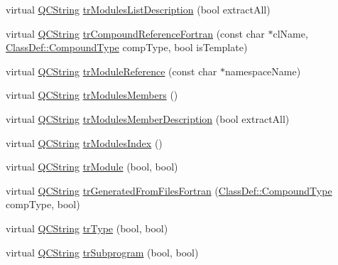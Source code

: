 \begin{DoxyCompactItemize}
\item 
virtual \mbox{\hyperlink{class_q_c_string}{Q\+C\+String}} \mbox{\hyperlink{class_translator_chinesetraditional_ab4c7704858f5c6b7d92b9a367c315b34}{tr\+Modules\+List\+Description}} (bool extract\+All)
\item 
virtual \mbox{\hyperlink{class_q_c_string}{Q\+C\+String}} \mbox{\hyperlink{class_translator_chinesetraditional_a7a1b3c9186c8afb16d7538fbd7f66f0b}{tr\+Compound\+Reference\+Fortran}} (const char $\ast$cl\+Name, \mbox{\hyperlink{class_class_def_ae70cf86d35fe954a94c566fbcfc87939}{Class\+Def\+::\+Compound\+Type}} comp\+Type, bool is\+Template)
\item 
virtual \mbox{\hyperlink{class_q_c_string}{Q\+C\+String}} \mbox{\hyperlink{class_translator_chinesetraditional_a63c0050b0ba4948ed0edb913712b1176}{tr\+Module\+Reference}} (const char $\ast$namespace\+Name)
\item 
virtual \mbox{\hyperlink{class_q_c_string}{Q\+C\+String}} \mbox{\hyperlink{class_translator_chinesetraditional_af13e010ffc89e71b48880caec4e508d1}{tr\+Modules\+Members}} ()
\item 
virtual \mbox{\hyperlink{class_q_c_string}{Q\+C\+String}} \mbox{\hyperlink{class_translator_chinesetraditional_a9bf54c19960f31410a7c1d3e06e71a95}{tr\+Modules\+Member\+Description}} (bool extract\+All)
\item 
virtual \mbox{\hyperlink{class_q_c_string}{Q\+C\+String}} \mbox{\hyperlink{class_translator_chinesetraditional_a31b911b3155793f6c936e4641d6c0861}{tr\+Modules\+Index}} ()
\item 
virtual \mbox{\hyperlink{class_q_c_string}{Q\+C\+String}} \mbox{\hyperlink{class_translator_chinesetraditional_a351a730e1e5f987c48e35459f7423d18}{tr\+Module}} (bool, bool)
\item 
virtual \mbox{\hyperlink{class_q_c_string}{Q\+C\+String}} \mbox{\hyperlink{class_translator_chinesetraditional_a97a68956eb70c4bd1187c14726069c29}{tr\+Generated\+From\+Files\+Fortran}} (\mbox{\hyperlink{class_class_def_ae70cf86d35fe954a94c566fbcfc87939}{Class\+Def\+::\+Compound\+Type}} comp\+Type, bool)
\item 
virtual \mbox{\hyperlink{class_q_c_string}{Q\+C\+String}} \mbox{\hyperlink{class_translator_chinesetraditional_a9de6a1d81990aeaa3f8d908a51f2ad72}{tr\+Type}} (bool, bool)
\item 
virtual \mbox{\hyperlink{class_q_c_string}{Q\+C\+String}} \mbox{\hyperlink{class_translator_chinesetraditional_ae442e7ae62789f601abb7d38c047631c}{tr\+Subprogram}} (bool, bool)
\item 

\end{DoxyCompactItemize}
